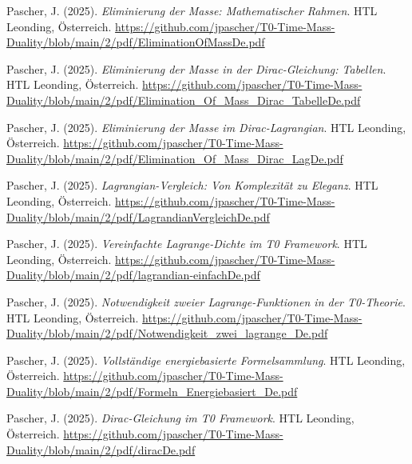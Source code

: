 \documentclass{article}
\begin{document}
\begin{thebibliography}{99}
		Pascher, J. (2025).
		\textit{Eliminierung der Masse: Mathematischer Rahmen}.
		HTL Leonding, Österreich.
		\url{https://github.com/jpascher/T0-Time-Mass-Duality/blob/main/2/pdf/EliminationOfMassDe.pdf}
		
		Pascher, J. (2025).
		\textit{Eliminierung der Masse in der Dirac-Gleichung: Tabellen}.
		HTL Leonding, Österreich.
		\url{https://github.com/jpascher/T0-Time-Mass-Duality/blob/main/2/pdf/Elimination_Of_Mass_Dirac_TabelleDe.pdf}
		
		Pascher, J. (2025).
		\textit{Eliminierung der Masse im Dirac-Lagrangian}.
		HTL Leonding, Österreich.
		\url{https://github.com/jpascher/T0-Time-Mass-Duality/blob/main/2/pdf/Elimination_Of_Mass_Dirac_LagDe.pdf}
		
		
		Pascher, J. (2025).
		\textit{Lagrangian-Vergleich: Von Komplexität zu Eleganz}.
		HTL Leonding, Österreich.
		\url{https://github.com/jpascher/T0-Time-Mass-Duality/blob/main/2/pdf/LagrandianVergleichDe.pdf}
		
		Pascher, J. (2025).
		\textit{Vereinfachte Lagrange-Dichte im T0 Framework}.
		HTL Leonding, Österreich.
		\url{https://github.com/jpascher/T0-Time-Mass-Duality/blob/main/2/pdf/lagrandian-einfachDe.pdf}
		
		Pascher, J. (2025).
		\textit{Notwendigkeit zweier Lagrange-Funktionen in der T0-Theorie}.
		HTL Leonding, Österreich.
		\url{https://github.com/jpascher/T0-Time-Mass-Duality/blob/main/2/pdf/Notwendigkeit_zwei_lagrange_De.pdf}
		
		Pascher, J. (2025).
		\textit{Vollständige energiebasierte Formelsammlung}.
		HTL Leonding, Österreich.
		\url{https://github.com/jpascher/T0-Time-Mass-Duality/blob/main/2/pdf/Formeln_Energiebasiert_De.pdf}
		
		
		Pascher, J. (2025).
		\textit{Dirac-Gleichung im T0 Framework}.
		HTL Leonding, Österreich.
		\url{https://github.com/jpascher/T0-Time-Mass-Duality/blob/main/2/pdf/diracDe.pdf}
		

\end{thebibliography}
\end{document}
